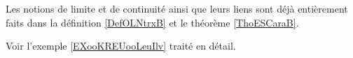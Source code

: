         \label{THEMEooGVCCooHBrNNd}


Les notions de limite et de continuité ainsi que leurs liens sont déjà entièrement faits dans la définition \ref{DefOLNtrxB} et le théorème \ref{ThoESCaraB}.

Voir l'exemple \ref{EXooKREUooLeuIlv} traité en détail.
